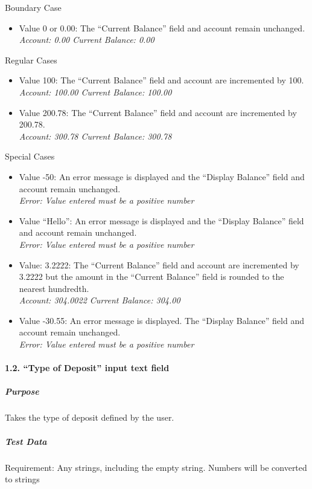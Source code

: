 \documentclass[12pt]{article}
\begin{document}
Boundary Case
\begin{itemize}
  \item Value 0 or 0.00: The ``Current Balance'' field and account remain unchanged.\\
{\it Account: 0.00 Current Balance: 0.00}
\end{itemize}

Regular Cases
\begin{itemize}
  \item Value 100: The ``Current Balance'' field and account are incremented by 100. 
{\it Account: 100.00 Current Balance: 100.00}
  \item Value 200.78: The ``Current Balance'' field and account are incremented by 200.78.\\
{\it Account: 300.78 Current Balance: 300.78}
\end{itemize}

Special Cases
\begin{itemize}
  \item Value -50: An error message is displayed and the ``Display Balance'' field and account remain unchanged.\\
{\it Error: Value entered must be a positive number}
  \item Value ``Hello'': An error message is displayed and the ``Display Balance'' field and account remain unchanged.\\
{\it Error: Value entered must be a positive number}
  \item Value: 3.2222: The ``Current Balance'' field and account are incremented by 3.2222 but the amount in the ``Current Balance'' field is rounded to the nearest hundredth.\\
{\it Account: 304.0022 Current Balance: 304.00}
  \item Value -30.55: An error message is displayed. The ``Display Balance'' field and account remain unchanged.\\
{\it Error: Value entered must be a positive number}
\end{itemize}

\paragraph{1.2. ``Type of Deposit'' input text field}
\subparagraph{Purpose} Takes the type of deposit defined by the user.

\subparagraph{Test Data} Requirement: Any strings, including the empty string. Numbers will be converted to strings
\end{document}
